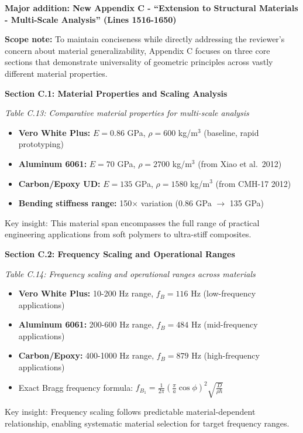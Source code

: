 \documentclass[11pt,a4paper]{article}
\newenvironment{changesbox}{%
    \par\medskip\noindent{\color{changescolor}\rule{\linewidth}{2pt}}\par
    \noindent{\color{changescolor}\bfseries Manuscript Changes}\par\smallskip
}{%
    \par\noindent{\color{changescolor}\rule{\linewidth}{0.5pt}}\medskip
}
\begin{document}
\begin{changesbox}
\textbf{Major addition: New Appendix C - ``Extension to Structural Materials - Multi-Scale Analysis'' (Lines 1516-1650)}

\textbf{Scope note:} To maintain conciseness while directly addressing the reviewer's concern about material generalizability, Appendix C focuses on three core sections that demonstrate universality of geometric principles across vastly different material properties.

\textbf{Section C.1: Material Properties and Scaling Analysis}

\textit{Table C.13: Comparative material properties for multi-scale analysis}
\begin{itemize}
    \item \textbf{Vero White Plus:} $E = 0.86$ GPa, $\rho = 600$ kg/m$^3$ (baseline, rapid prototyping)
    \item \textbf{Aluminum 6061:} $E = 70$ GPa, $\rho = 2700$ kg/m$^3$ (from Xiao et al.~2012)
    \item \textbf{Carbon/Epoxy UD:} $E = 135$ GPa, $\rho = 1580$ kg/m$^3$ (from CMH-17 2012)
    \item \textbf{Bending stiffness range:} 150$\times$ variation (0.86 GPa $\to$ 135 GPa)
\end{itemize}

Key insight: This material span encompasses the full range of practical engineering applications from soft polymers to ultra-stiff composites.

\textbf{Section C.2: Frequency Scaling and Operational Ranges}

\textit{Table C.14: Frequency scaling and operational ranges across materials}
\begin{itemize}
    \item \textbf{Vero White Plus:} 10-200 Hz range, $f_B = 116$ Hz (low-frequency applications)
    \item \textbf{Aluminum 6061:} 200-600 Hz range, $f_B = 484$ Hz (mid-frequency applications)
    \item \textbf{Carbon/Epoxy:} 400-1000 Hz range, $f_B = 879$ Hz (high-frequency applications)
    \item Exact Bragg frequency formula: $f_{B_1} = \frac{1}{2\pi}\left(\frac{\pi}{a}\cos\phi\right)^2 \sqrt{\frac{D}{\rho h}}$
\end{itemize}

Key insight: Frequency scaling follows predictable material-dependent relationship, enabling systematic material selection for target frequency ranges.


\end{changesbox}
\end{document}
